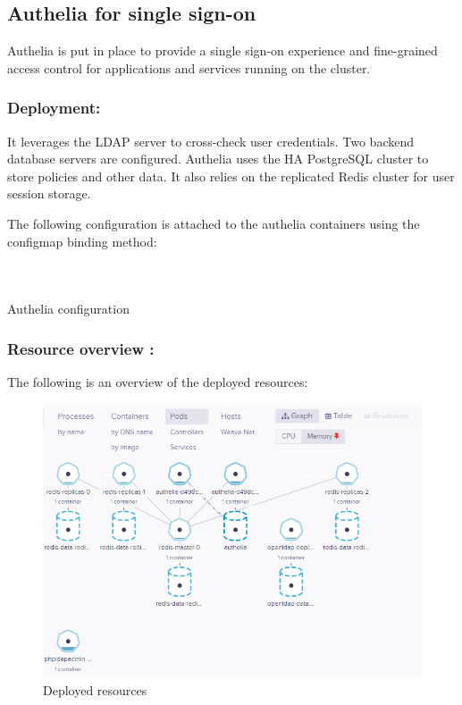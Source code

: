\subsection{Authelia for single sign-on }

Authelia is put in place to provide a single sign-on experience and fine-grained access control for applications and services running on the cluster.  

\subsubsection{Deployment: }

It leverages the LDAP server to cross-check user credentials. Two backend database servers are configured. Authelia uses the HA PostgreSQL cluster to store policies and other data. It also relies on the replicated Redis cluster for user session storage. 

The following configuration is attached to the authelia containers using the configmap binding method: 

\begin{listing}[H]
    \inputminted[firstline=1,lastline=25]{Yaml}{codeListing/authelia_configmap.yml}
\end{listing}

\begin{listing}[H]
    \inputminted[firstline=26,lastline=55]{Yaml}{codeListing/authelia_configmap.yml}
\end{listing}

\begin{listing}[H]
    \inputminted[firstline=56]{Yaml}{codeListing/authelia_configmap.yml}
    \caption{Authelia configuration}
    \label{lst:Authelia configuration}
\end{listing}

\subsubsection{Resource overview : }

The following is an overview of the deployed resources: 
\begin{figure}[H]\centering
\includegraphics[width=1.0\textwidth,angle=00]{assets/f54.png}
\caption{Deployed resources}
\label{fig:f54}
\end{figure}


